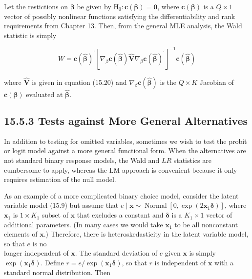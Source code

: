 \documentclass[10pt]{article}
\begin{document}
Let the restictions on $\boldsymbol{\beta}$ be given by $\mathrm{H}_{0}: \mathbf{c}(\boldsymbol{\beta})=\mathbf{0}$, where $\mathbf{c}(\boldsymbol{\beta})$ is a $Q \times 1$ vector of possibly nonlinear functions satisfying the differentiability and rank requirements from Chapter 13. Then, from the general MLE analysis, the Wald statistic is simply


\begin{equation*}
W=\mathbf{c}(\hat{\boldsymbol{\beta}})^{\prime}\left[\nabla_{\beta} \mathbf{c}(\hat{\boldsymbol{\beta}}) \hat{\mathbf{V}} \nabla_{\beta} \mathbf{c}(\hat{\boldsymbol{\beta}})^{\prime}\right]^{-1} \mathbf{c}(\hat{\boldsymbol{\beta}}) \tag{15.23}
\end{equation*}


where $\hat{\mathbf{V}}$ is given in equation (15.20) and $\nabla_{\beta} \mathbf{c}(\hat{\boldsymbol{\beta}})$ is the $Q \times K$ Jacobian of $\mathbf{c}(\boldsymbol{\beta})$ evaluated at $\hat{\boldsymbol{\beta}}$.

\subsection*{15.5.3 Tests against More General Alternatives}
In addition to testing for omitted variables, sometimes we wish to test the probit or logit model against a more general functional form. When the alternatives are not standard binary response models, the Wald and $L R$ statistics are cumbersome to apply, whereas the LM approach is convenient because it only requires estimation of the null model.

As an example of a more complicated binary choice model, consider the latent variable model (15.9) but assume that $e \mid \mathbf{x} \sim \operatorname{Normal}\left[0, \exp \left(2 \mathbf{x}_{1} \boldsymbol{\delta}\right)\right]$, where $\mathbf{x}_{1}$ is $1 \times K_{1}$ subset of $\mathbf{x}$ that excludes a constant and $\boldsymbol{\delta}$ is a $K_{1} \times 1$ vector of additional parameters. (In many cases we would take $\mathbf{x}_{1}$ to be all nonconstant elements of $\mathbf{x}$.) Therefore, there is heteroskedasticity in the latent variable model, so that $e$ is no\\
longer independent of $\mathbf{x}$. The standard deviation of $e$ given $\mathbf{x}$ is simply $\exp \left(\mathbf{x}_{1} \boldsymbol{\delta}\right)$. Define $r=e / \exp \left(\mathbf{x}_{1} \boldsymbol{\delta}\right)$, so that $r$ is independent of $\mathbf{x}$ with a standard normal distribution. Then
\end{document}
